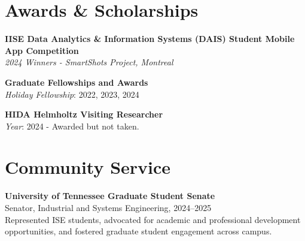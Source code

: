 \documentclass[10pt, letterpaper]{article}
\begin{document}





        \section*{Awards \& Scholarships}
        \small
        \noindent \textbf{IISE Data Analytics \& Information Systems (DAIS) Student Mobile App Competition} \\
        \textit{2024 Winners - SmartShots Project, Montreal} \\
        
        
        \vspace{0.5em} %
        
        \noindent \textbf{Graduate Fellowships and Awards} \\
        \textit{Holiday Fellowship}: 2022, 2023, 2024 \\
        
        \vspace{0.5em} %
        
        \noindent \textbf{HIDA Helmholtz Visiting Researcher} \\
        \textit{Year}: 2024 - Awarded but not taken.

        





\section*{Community Service}
\small
\textbf{University of Tennessee Graduate Student Senate} \\  
Senator, Industrial and Systems Engineering, 2024–2025 \\  
Represented ISE students, advocated for academic and professional development opportunities, and fostered graduate student engagement across campus.



\end{document}
